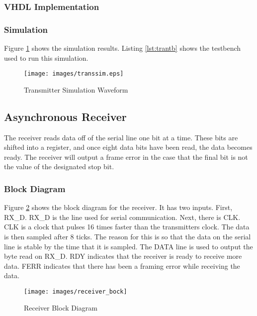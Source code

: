\documentclass[12pt, a4paper]{article}
\begin{document}
\subsubsection{VHDL Implementation}
\lstset{ %
language=VHDL,                %
basicstyle=\footnotesize,
numbers=left,                   %
stepnumber=1,                   %
numbersep=10pt,                  %
showspaces=false,               %
showstringspaces=false,         %
showtabs=false,                 %
frame=none,	                %
tabsize=2,	                %
captionpos=b,                   %
breaklines=true,                %
breakatwhitespace=false        %
}
\lstset{caption=Transmitter,label=lst:tran}


\subsubsection{Simulation}
Figure \ref{fig:transsim} shows the simulation results. Listing \ref{lst:trantb} shows the testbench
used to run this simulation.
\begin{figure}[H]
  \centering
  \texttt{[image: images/transsim.eps]}
  \caption{Transmitter Simulation Waveform}
  \label{fig:transsim}
\end{figure}


\subsection{Asynchronous Receiver}
The receiver reads data off of the serial line one bit at a time. These bits are shifted into a register,
and once eight data bits have been read, the data becomes ready. The receiver will output a frame error in
the case that the final bit is not the value of the designated stop bit.
\subsubsection{Block Diagram}
Figure \ref{fig:rec_blk} shows the block diagram for the receiver. It has two inputs. First, RX\_D. RX\_D is
the line used for serial communication. Next, there is CLK. CLK is a clock that pulses 16 times faster than
the transmitters clock. The data is then sampled after 8 ticks. The reason for this is so that the data on
the serial line is stable by the time that it is sampled. The DATA line is used to output the byte read on
RX\_D. RDY indicates that the receiver is ready to receive more data. FERR indicates that there has been a
framing error while receiving the data.
\begin{figure}[H]
  \caption{Receiver Block Diagram}
  \centering
  \texttt{[image: images/receiver\_bock]}
  \label{fig:rec_blk}
\end{figure}
\end{document}

